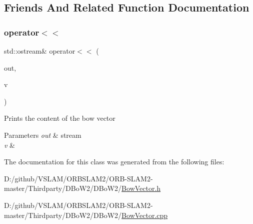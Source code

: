 \subsection{Friends And Related Function Documentation}
\mbox{\label{class_d_bo_w2_1_1_bow_vector_a1a7d9ac0f9128538859adfea38453ae1}} 
\subsubsection{\texorpdfstring{operator$<$$<$}{operator<<}}
{\footnotesize\ttfamily std\+::ostream\& operator$<$$<$ (\begin{DoxyParamCaption}\item[{std\+::ostream \&}]{out,  }\item[{const \mbox{\hyperlink{class_d_bo_w2_1_1_bow_vector}{Bow\+Vector}} \&}]{v }\end{DoxyParamCaption})\hspace{0.3cm}{\ttfamily [friend]}}

Prints the content of the bow vector 
\begin{DoxyParams}{Parameters}
{\em out} & stream \\
\hline
{\em v} & \\
\hline
\end{DoxyParams}


The documentation for this class was generated from the following files\+:\begin{DoxyCompactItemize}
\item 
D\+:/github/\+V\+S\+L\+A\+M/\+O\+R\+B\+S\+L\+A\+M2/\+O\+R\+B-\/\+S\+L\+A\+M2-\/master/\+Thirdparty/\+D\+Bo\+W2/\+D\+Bo\+W2/\mbox{\hyperlink{_bow_vector_8h}{Bow\+Vector.\+h}}\item 
D\+:/github/\+V\+S\+L\+A\+M/\+O\+R\+B\+S\+L\+A\+M2/\+O\+R\+B-\/\+S\+L\+A\+M2-\/master/\+Thirdparty/\+D\+Bo\+W2/\+D\+Bo\+W2/\mbox{\hyperlink{_bow_vector_8cpp}{Bow\+Vector.\+cpp}}\end{DoxyCompactItemize}
